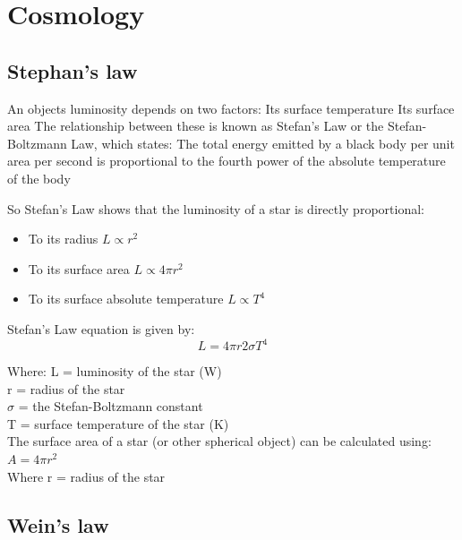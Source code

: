 \documentclass[a4paper,12pt]{book}
\begin{document}
\chapter{Cosmology}

\section{Stephan's law}
An objects luminosity depends on two factors:
Its surface temperature
Its surface area
The relationship between these is known as Stefan's Law or the Stefan-Boltzmann Law, which states:
The total energy emitted by a black body per unit area per second is proportional to the fourth power of the absolute temperature of the body

So Stefan's Law shows that the luminosity of a star is directly proportional:
\begin{itemize}
    \item To its radius $L \propto r^2$
    \item To its surface area $L \propto 4 \pi r^2$
    \item To its surface absolute temperature $L \propto T^4$
\end{itemize}

Stefan's Law equation is given by:
\begin{equation*}
    L = 4 \pi r2\sigma T^{4}
\end{equation*}

Where:
L = luminosity of the star (W)\\
r = radius of the star\\
$\sigma$ = the Stefan-Boltzmann constant\\
T = surface temperature of the star (K)\\
The surface area of a star (or other spherical object) can be calculated using: $A = 4\pi r^2$\\
Where r = radius of the star

\section{Wein's law}
\end{document}
